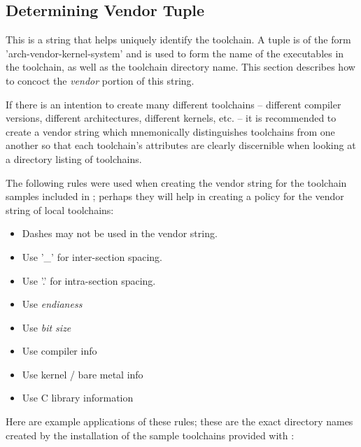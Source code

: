 \subsection{Determining Vendor Tuple}\label{toolchain-config:vendor-string}

This is a string that helps uniquely identify the toolchain.  A tuple
is of the form 'arch-vendor-kernel-system' and is used to form the
name of the executables in the toolchain, as well as the toolchain
directory name.  This section describes how to concoct the
\emph{vendor} portion of this string.

If there is an intention to create many different toolchains --
different compiler versions, different architectures, different
kernels, etc. -- it is recommended to create a vendor string which
mnemonically distinguishes toolchains from one another so that each
toolchain's attributes are clearly discernible when looking at a
directory listing of toolchains.

The following rules were used when creating the vendor string for the
toolchain samples included in \lmsbw; perhaps they will help in
creating a policy for the vendor string of local toolchains:

\begin{itemize}
\item{Dashes may not be used in the vendor string.}
\item{Use '\_' for inter-section spacing.}
\item{Use '.' for intra-section spacing.}
\item{Use \emph{endianess}}
\item{Use \emph{bit size}}
\item{Use compiler info}
\item{Use kernel / bare metal info}
\item{Use C library information}
\end{itemize}

Here are example applications of these rules; these are the exact
directory names created by the installation of the sample toolchains
provided with \lmsbw:

